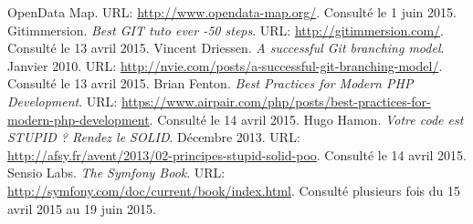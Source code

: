 \begin{thebibliography}{ABC}
     OpenData Map. URL: \url{http://www.opendata-map.org/}. Consulté le 1 juin 2015.
     Gitimmersion. \emph{Best GIT tuto ever -50 steps}. URL: \url{http://gitimmersion.com/}. Consulté le 13 avril 2015.
     Vincent Driessen. \emph{A successful Git branching model}. Janvier 2010. URL: \url{http://nvie.com/posts/a-successful-git-branching-model/}. Consulté le 13 avril 2015.
     Brian Fenton. \emph{Best Practices for Modern PHP Development}. URL: \url{https://www.airpair.com/php/posts/best-practices-for-modern-php-development}. Consulté le 14 avril 2015.
     Hugo Hamon. \emph{Votre code est STUPID ? Rendez le SOLID}. Décembre 2013. URL: \url{http://afsy.fr/avent/2013/02-principes-stupid-solid-poo}. Consulté le 14 avril 2015.
     Sensio Labs. \emph{The Symfony Book}. URL: \url{http://symfony.com/doc/current/book/index.html}. Consulté plusieurs fois du 15 avril 2015 au 19 juin 2015.
\end{thebibliography}
